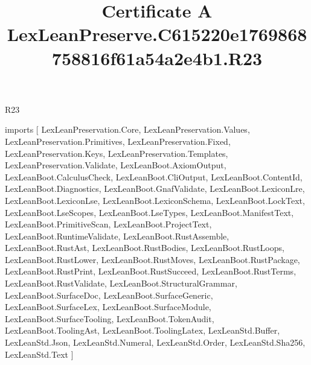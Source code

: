 \begin{lexlean}{R23}
\title{Certificate A LexLeanPreserve.C615220e1769868758816f61a54a2e4b1.R23}
\begin{coremodule}
imports [
  LexLeanPreservation.Core,
  LexLeanPreservation.Values,
  LexLeanPreservation.Primitives,
  LexLeanPreservation.Fixed,
  LexLeanPreservation.Keys,
  LexLeanPreservation.Templates,
  LexLeanPreservation.Validate,
  LexLeanBoot.AxiomOutput,
  LexLeanBoot.CalculusCheck,
  LexLeanBoot.CliOutput,
  LexLeanBoot.ContentId,
  LexLeanBoot.Diagnostics,
  LexLeanBoot.GnafValidate,
  LexLeanBoot.LexiconLre,
  LexLeanBoot.LexiconLse,
  LexLeanBoot.LexiconSchema,
  LexLeanBoot.LockText,
  LexLeanBoot.LseScopes,
  LexLeanBoot.LseTypes,
  LexLeanBoot.ManifestText,
  LexLeanBoot.PrimitiveScan,
  LexLeanBoot.ProjectText,
  LexLeanBoot.RuntimeValidate,
  LexLeanBoot.RustAssemble,
  LexLeanBoot.RustAst,
  LexLeanBoot.RustBodies,
  LexLeanBoot.RustLoops,
  LexLeanBoot.RustLower,
  LexLeanBoot.RustMoves,
  LexLeanBoot.RustPackage,
  LexLeanBoot.RustPrint,
  LexLeanBoot.RustSucceed,
  LexLeanBoot.RustTerms,
  LexLeanBoot.RustValidate,
  LexLeanBoot.StructuralGrammar,
  LexLeanBoot.SurfaceDoc,
  LexLeanBoot.SurfaceGeneric,
  LexLeanBoot.SurfaceLex,
  LexLeanBoot.SurfaceModule,
  LexLeanBoot.SurfaceTooling,
  LexLeanBoot.TokenAudit,
  LexLeanBoot.ToolingAst,
  LexLeanBoot.ToolingLatex,
  LexLeanStd.Buffer,
  LexLeanStd.Json,
  LexLeanStd.Numeral,
  LexLeanStd.Order,
  LexLeanStd.Sha256,
  LexLeanStd.Text
]


\end{coremodule}
\end{lexlean}
